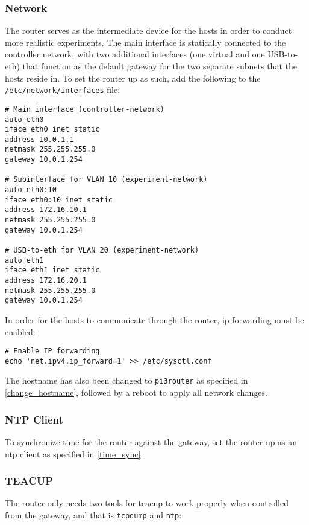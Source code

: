 \subsubsection{Network}

The router serves as the intermediate device for the hosts in order to conduct more realistic experiments. The main interface is statically connected to the controller network, with two additional interfaces (one virtual and one USB-to-eth) that function as the default gateway for the two separate subnets that the hosts reside in. To set the router up as such, add the following to the \lstinline{/etc/network/interfaces} file:

\begin{verbatim}
# Main interface (controller-network)
auto eth0
iface eth0 inet static
address 10.0.1.1
netmask 255.255.255.0
gateway 10.0.1.254

# Subinterface for VLAN 10 (experiment-network)
auto eth0:10
iface eth0:10 inet static
address 172.16.10.1
netmask 255.255.255.0
gateway 10.0.1.254

# USB-to-eth for VLAN 20 (experiment-network)
auto eth1
iface eth1 inet static
address 172.16.20.1
netmask 255.255.255.0
gateway 10.0.1.254
\end{verbatim}

In order for the hosts to communicate through the router, \gls{ip} forwarding must be enabled:

\begin{verbatim}
# Enable IP forwarding
echo 'net.ipv4.ip_forward=1' >> /etc/sysctl.conf
\end{verbatim}

The hostname has also been changed to \lstinline{pi3router} as specified in \ref{change_hostname}, followed by a reboot to apply all network changes.


\subsubsection{NTP Client}

To synchronize time for the router against the gateway, set the router up as an \gls{ntp} client as specified in \ref{time_sync}.


\subsubsection{TEACUP}

The router only needs two tools for \gls{teacup} to work properly when controlled from the gateway, and that is \lstinline{tcpdump} and \lstinline{ntp}:

